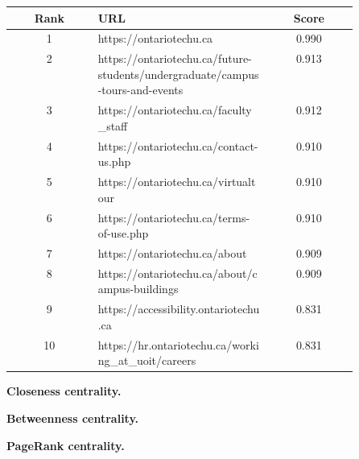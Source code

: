 \begin{table}
    \begin{tabular}{|c|p{0.5\linewidth}|c|}
            \hline
            \textbf{Rank} & \textbf{URL} & \textbf{Score} \\
            \hline
            1 & https://ontariotechu.ca & 0.990 \\
            \hline
            2 & https://ontariotechu.ca/future-students/undergraduate/campus-tours-and-events & 0.913 \\
            \hline
            3 & https://ontariotechu.ca/faculty_staff & 0.912 \\
            \hline
            4 & https://ontariotechu.ca/contact-us.php & 0.910 \\
            \hline
            5 & https://ontariotechu.ca/virtualtour & 0.910 \\
            \hline
            6 & https://ontariotechu.ca/terms-of-use.php & 0.910 \\
            \hline
            7 & https://ontariotechu.ca/about & 0.909 \\
            \hline
            8 & https://ontariotechu.ca/about/campus-buildings & 0.909 \\
            \hline
            9 & https://accessibility.ontariotechu.ca & 0.831 \\
            \hline
            10 & https://hr.ontariotechu.ca/working_at_uoit/careers & 0.831 \\
            \hline
        \end{tabular}
        \label{table:degree_centrality_otu}
\end{table}

\textbf{Closeness centrality.}

\textbf{Betweenness centrality.}

\textbf{PageRank centrality.}